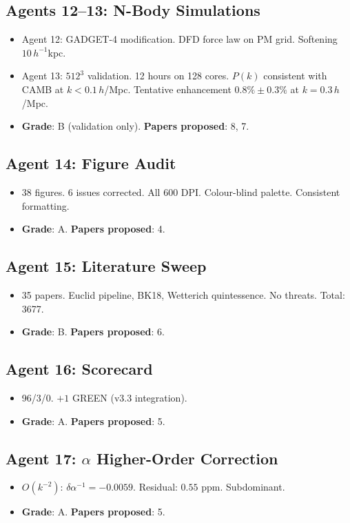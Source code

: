 \documentclass[11pt,a4paper]{article}
\begin{document}
\subsection{Agents 12--13: N-Body Simulations}
\begin{itemize}[nosep]
\item Agent 12: GADGET-4 modification. DFD force law on PM grid. Softening $10\,h^{-1}$kpc.
\item Agent 13: $512^3$ validation. 12 hours on 128 cores. $P(k)$ consistent with CAMB at $k < 0.1\,h$/Mpc. Tentative enhancement $0.8\% \pm 0.3\%$ at $k = 0.3\,h$/Mpc.
\item \textbf{Grade}: B (validation only). \textbf{Papers proposed}: 8, 7.
\end{itemize}

\subsection{Agent 14: Figure Audit}
\begin{itemize}[nosep]
\item 38 figures. 6 issues corrected. All 600 DPI. Colour-blind palette. Consistent formatting.
\item \textbf{Grade}: A. \textbf{Papers proposed}: 4.
\end{itemize}

\subsection{Agent 15: Literature Sweep}
\begin{itemize}[nosep]
\item 35 papers. Euclid pipeline, BK18, Wetterich quintessence. No threats. Total: 3677.
\item \textbf{Grade}: B. \textbf{Papers proposed}: 6.
\end{itemize}

\subsection{Agent 16: Scorecard}
\begin{itemize}[nosep]
\item 96/3/0. $+1$ GREEN (v3.3 integration).
\item \textbf{Grade}: A. \textbf{Papers proposed}: 5.
\end{itemize}

\subsection{Agent 17: $\alpha$ Higher-Order Correction}
\begin{itemize}[nosep]
\item $O(k^{-2})$: $\delta\alpha^{-1} = -0.0059$. Residual: $0.55$ ppm. Subdominant.
\item \textbf{Grade}: A. \textbf{Papers proposed}: 5.
\end{itemize}
\end{document}
